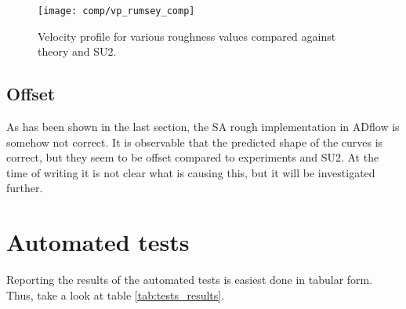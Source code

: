\begin{figure}[H] \centering
  \texttt{[image: comp/vp\_rumsey\_comp]}
    \caption{Velocity profile for various roughness values compared
      against theory and SU2.}
    \label{fig:vp_rumsey_comp}
\end{figure}

\subsection{Offset}
As has been shown in the last section, the SA rough implementation in ADflow is
somehow not correct. It is observable that the predicted shape of the curves is
correct, but they seem to be offset compared to experiments and SU2. At the time
of writing it is not clear what is causing this, but it will be investigated
further.

\section{Automated tests} Reporting the results of the automated tests is
easiest done in tabular form.
Thus, take a look at table \ref{tab:tests_results}.


